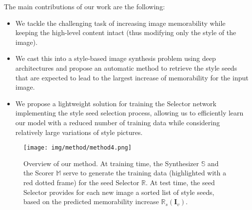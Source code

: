 \documentclass{sig-alternate-05-2015}
\begin{document}
The main contributions of our work are the following:
\vspace{-0.1cm}
\begin{itemize}
\setlength\itemsep{0.0cm}
    \item We tackle the challenging task of increasing image memorability while keeping the high-level content intact (thus modifying only the style of the image).%
    \item We cast this into a style-based image synthesis problem using deep architectures 
    and propose an automatic method to retrieve the style seeds that are expected to lead to the largest increase of memorability for the input image.
    \item We propose a lightweight solution for training the Selector network implementing the style seed selection process, allowing us to efficiently learn our model with a reduced number of training data while considering  relatively large variations of style pictures.
\end{itemize}





\begin{figure*}[t]
\texttt{[image: img/method/method4.png]}
\vspace{-0.6cm}
\caption{Overview of our method. At training time, the Synthesizer $\mathbb{S}$ and the Scorer $\mathbb{M}$ serve to generate the training data (highlighted with a red dotted frame) for the seed Selector $\mathbb{R}$. 
At test time, the seed Selector provides for each new image a sorted list of style seeds, based on the predicted memorability increase $\mathbb{R}_{s}(\mathbf{I}_v)$.  }
\label{fig:method}
\vspace{-0.3cm}
\end{figure*}
\end{document}
